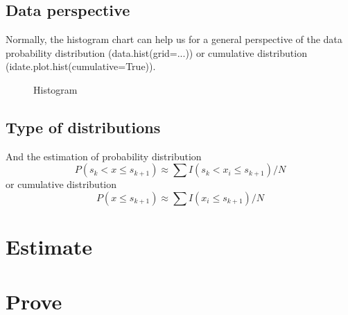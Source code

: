 \documentclass[UTF8]{article} %
\begin{document}
\subsection{Data perspective}
Normally, the histogram chart can help us for a general perspective of the data probability distribution (data.hist(grid=...)) or cumulative distribution (idate.plot.hist(cumulative=True)).
\begin{figure}[htb]
\centering
{}
\caption{Histogram}
\label{fig:2}
\end{figure}
\subsection{Type of distributions}




And the estimation of probability distribution
$$
P(s_k<x\leq s_{k+1})\approx \sum I(s_k<x_i\leq s_{k+1})/N
$$
or cumulative distribution
$$
P(x\leq s_{k+1})\approx\sum I(x_i\leq s_{k+1})/N
$$


\section{Estimate}

\section{Prove}
\end{document}
